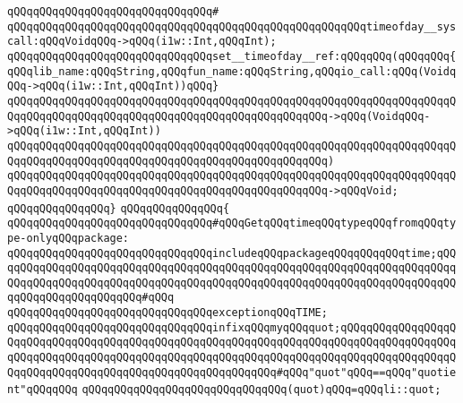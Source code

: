 \verb|qQQqqQQqqQQqqQQqqQQqqQQqqQQqqQQq#|\newline
\verb|qQQqqQQqqQQqqQQqqQQqqQQqqQQqqQQqqQQqqQQqqQQqqQQqqQQqqQQqtimeofday__syscall:qQQqVoidqQQq->qQQq(i1w::Int,qQQqInt);|\newline
\verb|qQQqqQQqqQQqqQQqqQQqqQQqqQQqqQQqset__timeofday__ref:qQQqqQQq(qQQqqQQq{qQQqlib_name:qQQqString,qQQqfun_name:qQQqString,qQQqio_call:qQQq(VoidqQQq->qQQq(i1w::Int,qQQqInt))qQQq}|\newline
\verb|qQQqqQQqqQQqqQQqqQQqqQQqqQQqqQQqqQQqqQQqqQQqqQQqqQQqqQQqqQQqqQQqqQQqqQQqqQQqqQQqqQQqqQQqqQQqqQQqqQQqqQQqqQQqqQQqqQQqqQQq->qQQq(VoidqQQq->qQQq(i1w::Int,qQQqInt))|\newline
\verb|qQQqqQQqqQQqqQQqqQQqqQQqqQQqqQQqqQQqqQQqqQQqqQQqqQQqqQQqqQQqqQQqqQQqqQQqqQQqqQQqqQQqqQQqqQQqqQQqqQQqqQQqqQQqqQQqqQQqqQQq)|\newline
\verb|qQQqqQQqqQQqqQQqqQQqqQQqqQQqqQQqqQQqqQQqqQQqqQQqqQQqqQQqqQQqqQQqqQQqqQQqqQQqqQQqqQQqqQQqqQQqqQQqqQQqqQQqqQQqqQQqqQQqqQQq->qQQqVoid;|\newline
\verb|qQQqqQQqqQQqqQQq}|\newline
\verb|qQQqqQQqqQQqqQQq{|\newline
\newline
\verb|qQQqqQQqqQQqqQQqqQQqqQQqqQQqqQQq#qQQqGetqQQqtimeqQQqtypeqQQqfromqQQqtype-onlyqQQqpackage:|\newline
\newline
\verb|qQQqqQQqqQQqqQQqqQQqqQQqqQQqqQQqincludeqQQqpackageqQQqqQQqqQQqtime;qQQqqQQqqQQqqQQqqQQqqQQqqQQqqQQqqQQqqQQqqQQqqQQqqQQqqQQqqQQqqQQqqQQqqQQqqQQqqQQqqQQqqQQqqQQqqQQqqQQqqQQqqQQqqQQqqQQqqQQqqQQqqQQqqQQqqQQqqQQqqQQqqQQqqQQqqQQqqQQqqQQq#qQQq|\newline
\newline
\verb|qQQqqQQqqQQqqQQqqQQqqQQqqQQqqQQqexceptionqQQqTIME;|\newline
\newline
\verb|qQQqqQQqqQQqqQQqqQQqqQQqqQQqqQQqinfixqQQqmyqQQqquot;qQQqqQQqqQQqqQQqqQQqqQQqqQQqqQQqqQQqqQQqqQQqqQQqqQQqqQQqqQQqqQQqqQQqqQQqqQQqqQQqqQQqqQQqqQQqqQQqqQQqqQQqqQQqqQQqqQQqqQQqqQQqqQQqqQQqqQQqqQQqqQQqqQQqqQQqqQQqqQQqqQQqqQQqqQQqqQQqqQQqqQQqqQQqqQQqqQQqqQQq#qQQq"quot"qQQq==qQQq"quotient"qQQqqQQq|\newline
\newline
\verb|qQQqqQQqqQQqqQQqqQQqqQQqqQQqqQQq(quot)qQQq=qQQqli::quot;|\newline
\newline
